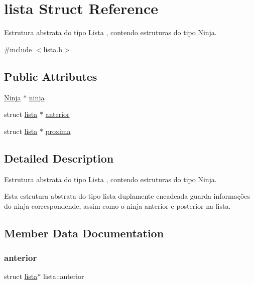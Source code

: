 \hypertarget{structlista}{}\section{lista Struct Reference}
\label{structlista}


Estrutura abstrata do tipo Lista , contendo estruturas do tipo Ninja.  




{\ttfamily \#include $<$lista.\+h$>$}

\subsection*{Public Attributes}
\begin{DoxyCompactItemize}
\item 
\mbox{\hyperlink{structninja}{Ninja}} $\ast$ \mbox{\hyperlink{structlista_afabad83af39f6c62e272a359b377ad74}{ninja}}
\item 
struct \mbox{\hyperlink{structlista}{lista}} $\ast$ \mbox{\hyperlink{structlista_a37e0c108b39d567c708004234ca03330}{anterior}}
\item 
struct \mbox{\hyperlink{structlista}{lista}} $\ast$ \mbox{\hyperlink{structlista_a75a04eea3bf4bbc679c49464ae83cabb}{proxima}}
\end{DoxyCompactItemize}


\subsection{Detailed Description}
Estrutura abstrata do tipo Lista , contendo estruturas do tipo Ninja. 

Esta estrutura abstrata do tipo lista duplamente encadeada guarda informações do ninja correspondende, assim como o ninja anterior e posterior na lista. 

\subsection{Member Data Documentation}
\mbox{\label{structlista_a37e0c108b39d567c708004234ca03330}} 
\subsubsection{\texorpdfstring{anterior}{anterior}}
{\footnotesize\ttfamily struct \mbox{\hyperlink{structlista}{lista}}$\ast$ lista\+::anterior}

